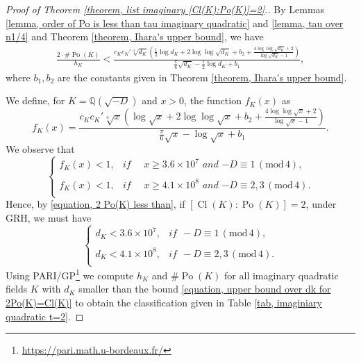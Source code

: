 \documentclass[12pt]{amsart}
\theoremstyle{definition}
\numberwithin{equation}{section}
\DeclareMathOperator{\Po}{Po}
\DeclareMathOperator{\Cl}{Cl}
\begin{document}
\begin{proof}[Proof of Theorem \ref{theorem, list imaginary [Cl(K):Po(K)]=2}.]  
	By Lemmas \ref{lemma, order of Po is less than tau imaginary quadratic} and \ref{lemma, tau over n1/4} and Theorem \ref{theorem, Ihara's upper bound}, we have
	\begin{align} \label{equation, 2 Po(K) less than}
		\frac{2\cdot\#\Po(K)}{h_K} < \frac{c_K c_K' \sqrt[4]{d_K}\left( \frac{1}{2} \log {d_K} + 2 \log \log \sqrt{{d_K}} +b_2+\frac{4 \log \log \sqrt{{d_K}} +2}{\log \sqrt{{d_K}} -1} \right)}{\frac{\pi}{6} \sqrt{{d_K}}-\frac{1}{2} \log {d_K} +b_1},	
	\end{align}
	where 
 $b_1,b_2$ are the constants given in Theorem \ref{theorem, Ihara's upper bound}. 
 	
We define, for $K=\mathbb{Q}(\sqrt{-D})$ and $x>0$, the function $f_K(x)$ as
	\begin{equation*}
		f_K(x)=\frac{ c_K c_K' \sqrt[4]{x}\left(  \log \sqrt{x} + 2 \log \log \sqrt{x} +b_2+\frac{4 \log \log \sqrt{x} +2}{\log \sqrt{x} -1} \right)}{\frac{\pi}{6} \sqrt{x}- \log \sqrt{x} +b_1}.
	\end{equation*}
 We observe that
	\begin{equation*}
		\left\{
		\begin{array}{ll}
			f_K(x)<1, & \textit{if ~~ $x \geq 3.6\times 10^7$ and $-D \equiv 1 \, (\mathrm{mod}\, 4)$},\\
			& \\
			f_K(x) <1,	 & \textit{if ~~ $x \geq 4.1 \times 10^8$ and $-D \equiv 2,3 \, (\mathrm{mod}\, 4)$}.\\
		\end{array}
		\right.
	\end{equation*}
	Hence, by \eqref{equation, 2 Po(K) less than}, if $\left[\Cl(K): \Po(K)\right]=2$, under GRH, we must have 
	\begin{equation} \label{equation, upper bound over dk for 2Po(K)=Cl(K)}
		\left\{
		\begin{array}{ll}
			{d_K} < 3.6\times 10^7, & \textit{if} ~~ -D \equiv 1 \, (\mathrm{mod}\, 4),\\
			& \\
			{d_K} < 4.1  \times 10^8,  & \textit{if} ~~ -D \equiv 2,3 \, (\mathrm{mod}\, 4).\\
		\end{array}
		\right.
	\end{equation}
Using PARI/GP\footnote{\url{https://pari.math.u-bordeaux.fr/}} we compute $h_K$ and $\# \Po(K)$ for all imaginary quadratic fields $K$ with ${d_K}$ smaller than the bound \eqref{equation, upper bound over dk for 2Po(K)=Cl(K)} to obtain the classification given in Table \ref{tab, imaginiary quadratic t=2}.
\end{proof}
\end{document}
